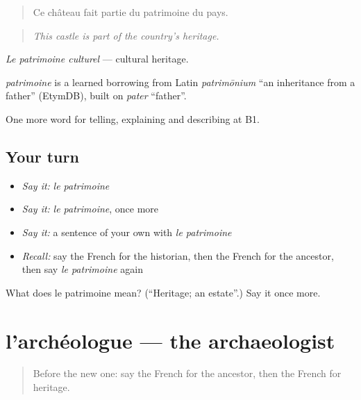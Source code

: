 \begin{quote}
Ce château fait partie du patrimoine du pays.
\end{quote}

\begin{quote}
\emph{This castle is part of the country's heritage.}
\end{quote}

\emph{Le patrimoine culturel} — cultural heritage.

\begin{cousinweb}
\emph{patrimoine} is a learned borrowing from Latin \emph{patrimōnium} \textquotedblleft{}an inheritance from a father\textquotedblright{} (EtymDB), built on \emph{pater} \textquotedblleft{}father\textquotedblright{}.
\end{cousinweb}

\begin{grammarlens}[title={What you've built}]
One more word for telling, explaining and describing at B1.
\end{grammarlens}

\subsection*{Your turn}
\begin{itemize}
\raggedright
  \item \emph{Say it:} \emph{le patrimoine}
  \item \emph{Say it:} \emph{le patrimoine}, once more
  \item \emph{Say it:} a sentence of your own with \emph{le patrimoine}
  \item \emph{Recall:} say the French for the historian, then the French for the ancestor, then say \emph{le patrimoine} again
\end{itemize}

\begin{tcolorbox}[breakable,colback=teal!4,colframe=teal!35!black,title={Before you move on}]
What does le patrimoine mean? (\textquotedblleft{}Heritage; an estate\textquotedblright{}.) Say it once more.
\end{tcolorbox}
\section[l'archéologue]{l'archéologue — the archaeologist}

\label{lesson:FR-C325-archeologue}



\begin{quote}
Before the new one: say the French for the ancestor, then the French for heritage.
\end{quote}

